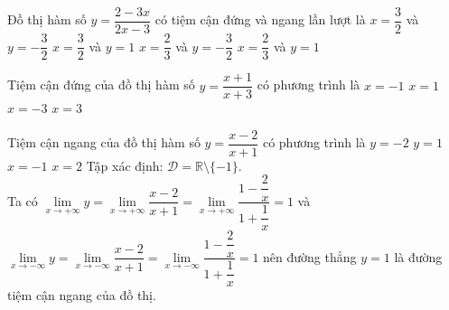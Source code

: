 \begin{ex}%
    Đồ thị hàm số $y=\dfrac{2-3 x}{2 x-3}$ có tiệm cận đứng và ngang lần lượt là
    \choice
    {\True $x=\dfrac{3}{2}$ và $y=-\dfrac{3}{2}$}
    {$x=\dfrac{3}{2}$ và $y=1$}
    {$x=\dfrac{2}{3}$ và $y=-\dfrac{3}{2}$}
    {$x=\dfrac{2}{3}$ và $y=1$}
\end{ex}
\begin{ex}%
    Tiệm cận đứng của đồ thị hàm số $y=\dfrac{x+1}{x+3}$ có phương trình là
    \choice
    {$x=-1$}
    {$x=1$}
    {\True $x=-3$}
    {$x=3$}
\end{ex}
\begin{ex}%
    Tiệm cận ngang của đồ thị hàm số $y=\dfrac{x-2}{x+1}$ có phương trình là
    \choice
    {$y=-2$}
    {\True $y=1$}
    {$x=-1$}
    {$x=2$}
    \loigiai
    {
        Tập xác định: $\mathscr{D}=\mathbb{R}\setminus \{-1\}$.\\
        Ta có $\lim \limits_{x \to +\infty} y=\lim \limits_{x \to +\infty} \dfrac{x-2}{x+1}=\lim \limits_{x \to +\infty} \dfrac{1-\dfrac{2}{x}}{1+\dfrac{1}{x}}=1$ và $\lim \limits_{x \to -\infty} y=\lim \limits_{x \to -\infty} \dfrac{x-2}{x+1}=\lim \limits_{x \to -\infty} \dfrac{1-\dfrac{2}{x}}{1+\dfrac{1}{x}}=1$ nên đường thẳng $y=1$ là đường tiệm cận ngang của đồ thị.
    }
\end{ex}
